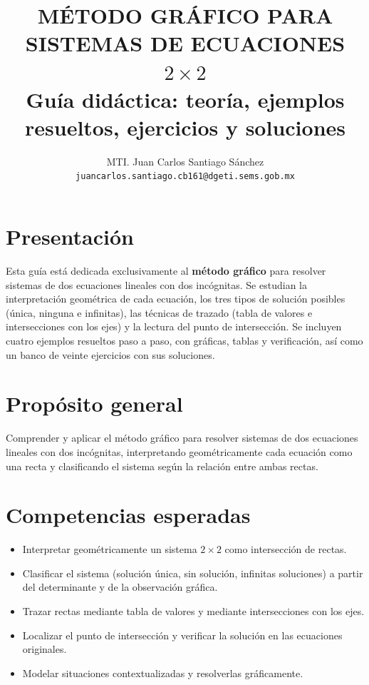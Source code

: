 \documentclass[12pt]{article}
\title{MÉTODO GRÁFICO PARA SISTEMAS DE ECUACIONES \(2\times 2\)\\[0.3em]
\large Guía didáctica: teoría, ejemplos resueltos, ejercicios y soluciones}
\author{MTI. Juan Carlos Santiago Sánchez\\[0.2em]
\texttt{juancarlos.santiago.cb161@dgeti.sems.gob.mx}}
\date{}
\begin{document}
\maketitle

\begingroup
  \setlength{\parskip}{0pt}
  \tableofcontents
\endgroup
\newpage


\section*{Presentación}

Esta guía está dedicada exclusivamente al \textbf{método gráfico} para resolver sistemas de dos ecuaciones lineales con dos incógnitas. Se estudian la interpretación geométrica de cada ecuación, los tres tipos de solución posibles (única, ninguna e infinitas), las técnicas de trazado (tabla de valores e intersecciones con los ejes) y la lectura del punto de intersección. Se incluyen cuatro ejemplos resueltos paso a paso, con gráficas, tablas y verificación, así como un banco de veinte ejercicios con sus soluciones.

\section*{Propósito general}

Comprender y aplicar el método gráfico para resolver sistemas de dos ecuaciones lineales con dos incógnitas, interpretando geométricamente cada ecuación como una recta y clasificando el sistema según la relación entre ambas rectas.

\section*{Competencias esperadas}

\begin{itemize}
  \item Interpretar geométricamente un sistema \(2\times 2\) como intersección de rectas.
  \item Clasificar el sistema (solución única, sin solución, infinitas soluciones) a partir del determinante y de la observación gráfica.
  \item Trazar rectas mediante tabla de valores y mediante intersecciones con los ejes.
  \item Localizar el punto de intersección y verificar la solución en las ecuaciones originales.
  \item Modelar situaciones contextualizadas y resolverlas gráficamente.
\end{itemize}
\end{document}

